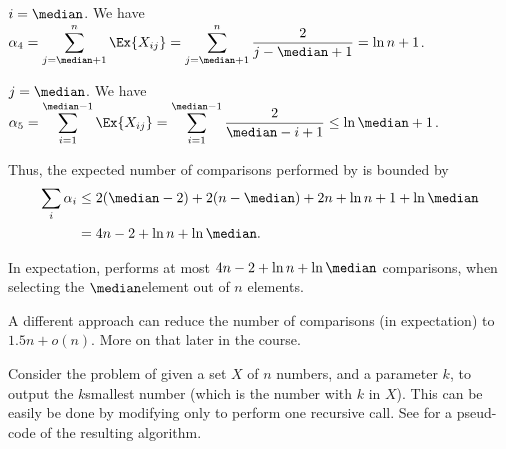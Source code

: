 \begin{compactenumi}
    \item $i=\median$.  We have $\displaystyle \alpha_4 =
    \sum_{j=\median+1}^n\Ex{X_{ij}} =
    \sum_{j=\median+1}^n\frac{2}{j-\median+1} = \ln n + 1$.
    
    \item $j=\median$.  We have $\displaystyle \alpha_5 =
    \sum_{i=1}^{\median-1}\Ex{X_{ij}} =
    \sum_{i=1}^{\median-1}\frac{2}{\median-i+1} \leq \ln \median +1$.
\end{compactenumi}
Thus, the expected number of comparisons performed by \QuickSelect is
bounded by 
\begin{align*}
    \sum_i \alpha_i
    &\leq 2(\median-2) + 2 ( n-\median)+2n+\ln n + 1 + \ln \median \\
    &= 4n -2 + \ln n + \ln \median.
\end{align*}

\begin{theorem}
    In expectation, \QuickSelect performs at most
    $4n -2 + \ln n + \ln \median$ comparisons, when selecting the
    $\median$\th element out of $n$ elements.
\end{theorem}

A different approach can reduce the number of comparisons (in
expectation) to $1.5n + o(n)$. More on that later in the course.







Consider the problem of given a set $X$ of $n$ numbers, and a
parameter $k$, to output the $k$\th smallest number (which is the
number with  $k$ in $X$). This can be easily be done by
modifying \QuickSort{} only to perform one recursive call.  See
 for a pseud-code of the resulting algorithm.

